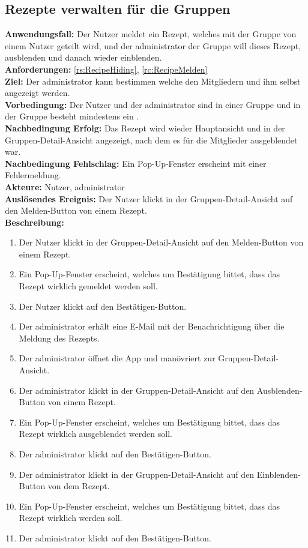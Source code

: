 \documentclass[parskip=full]{scrartcl}
\begin{document}
\subsection{Rezepte verwalten für die Gruppen}
\textbf{Anwendungsfall:} Der Nutzer meldet ein Rezept, welches mit der Gruppe von einem Nutzer geteilt wird, und der \gls{administrator} der Gruppe will dieses Rezept, \gls{ausblenden} und danach wieder \gls{einblenden}.\\
\textbf{Anforderungen:} \ref{rs:RecipeHiding}, \ref{rc:RecipeMelden}\\
\textbf{Ziel:} Der \gls{administrator} kann bestimmen welche  den Mitgliedern und ihm selbst angezeigt werden.\\
\textbf{Vorbedingung:} Der Nutzer und der \gls{administrator} sind in einer Gruppe und in der Gruppe besteht mindestens ein .\\
\textbf{Nachbedingung Erfolg:} Das Rezept wird wieder Hauptansicht und in der Gruppen-Detail-Ansicht angezeigt, nach dem es für die Mitglieder ausgeblendet war.\\
\textbf{Nachbedingung Fehlschlag:} Ein Pop-Up-Fenster erscheint mit einer Fehlermeldung.\\
\textbf{Akteure:} Nutzer, \gls{administrator}\\
\textbf{Auslösendes Ereignis:} Der Nutzer klickt in der Gruppen-Detail-Ansicht auf den Melden-Button von einem Rezept.\\
\textbf{Beschreibung:}
\begin{enumerate}
    \item Der Nutzer klickt in der Gruppen-Detail-Ansicht auf den Melden-Button von einem Rezept.
    \item Ein Pop-Up-Fenster erscheint, welches um Bestätigung bittet, dass das Rezept wirklich gemeldet werden soll.
    \item Der Nutzer klickt auf den Bestätigen-Button.
    \item Der \gls{administrator} erhält eine E-Mail mit der Benachrichtigung über die Meldung des Rezepts.
    \item Der \gls{administrator} öffnet die App und manövriert zur Gruppen-Detail-Ansicht.
    \item Der \gls{administrator} klickt in der Gruppen-Detail-Ansicht auf den Ausblenden-Button von einem Rezept.
    \item Ein Pop-Up-Fenster erscheint, welches um Bestätigung bittet, dass das Rezept wirklich ausgeblendet werden soll.
    \item Der \gls{administrator} klickt auf den Bestätigen-Button.
    \item Der \gls{administrator} klickt in der Gruppen-Detail-Ansicht auf den Einblenden-Button von dem  Rezept.
    \item Ein Pop-Up-Fenster erscheint, welches um Bestätigung bittet, dass das Rezept wirklich  werden soll.
    \item Der \gls{administrator} klickt auf den Bestätigen-Button.
\end{enumerate}
\end{document}
